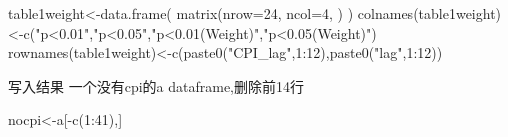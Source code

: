 \documentclass[
]{article}
\newenvironment{Shaded}{\begin{snugshade}}{\end{snugshade}}
\newcommand{\AttributeTok}[1]{\textcolor[rgb]{0.77,0.63,0.00}{#1}}
\newcommand{\DecValTok}[1]{\textcolor[rgb]{0.00,0.00,0.81}{#1}}
\newcommand{\FunctionTok}[1]{\textcolor[rgb]{0.00,0.00,0.00}{#1}}
\newcommand{\NormalTok}[1]{#1}
\newcommand{\OtherTok}[1]{\textcolor[rgb]{0.56,0.35,0.01}{#1}}
\newcommand{\SpecialCharTok}[1]{\textcolor[rgb]{0.00,0.00,0.00}{#1}}
\newcommand{\StringTok}[1]{\textcolor[rgb]{0.31,0.60,0.02}{#1}}
\begin{document}
\begin{Shaded}
\begin{Highlighting}[]
\NormalTok{table1weight}\OtherTok{\textless{}{-}}\FunctionTok{data.frame}\NormalTok{( }\FunctionTok{matrix}\NormalTok{(}\AttributeTok{nrow=}\DecValTok{24}\NormalTok{, }\AttributeTok{ncol=}\DecValTok{4}\NormalTok{, )   )}
\FunctionTok{colnames}\NormalTok{(table1weight)}\OtherTok{\textless{}{-}}\FunctionTok{c}\NormalTok{(}\StringTok{"p\textless{}0.01"}\NormalTok{,}\StringTok{"p\textless{}0.05"}\NormalTok{,}\StringTok{"p\textless{}0.01(Weight)"}\NormalTok{,}\StringTok{"p\textless{}0.05(Weight)"}\NormalTok{)}
\FunctionTok{rownames}\NormalTok{(table1weight)}\OtherTok{\textless{}{-}}\FunctionTok{c}\NormalTok{(}\FunctionTok{paste0}\NormalTok{(}\StringTok{"CPI\_lag"}\NormalTok{,}\DecValTok{1}\SpecialCharTok{:}\DecValTok{12}\NormalTok{),}\FunctionTok{paste0}\NormalTok{(}\StringTok{"lag"}\NormalTok{,}\DecValTok{1}\SpecialCharTok{:}\DecValTok{12}\NormalTok{))}
\end{Highlighting}
\end{Shaded}

写入结果 一个没有cpi的a dataframe,删除前14行

\begin{Shaded}
\begin{Highlighting}[]
\NormalTok{nocpi}\OtherTok{\textless{}{-}}\NormalTok{a[}\SpecialCharTok{{-}}\FunctionTok{c}\NormalTok{(}\DecValTok{1}\SpecialCharTok{:}\DecValTok{41}\NormalTok{),]}
\end{Highlighting}
\end{Shaded}
\end{document}
